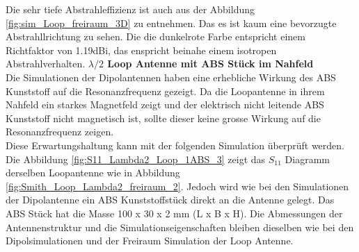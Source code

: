 Die sehr tiefe Abstrahleffizienz ist auch aus der Abbildung \ref{fig:sim_Loop_freiraum_3D} zu entnehmen. Das es ist kaum eine bevorzugte Abstrahllrichtung zu sehen. Die die dunkelrote Farbe entspricht einem Richtfaktor von 1.19dBi, das enspricht beinahe einem isotropen Abstrahlverhalten.
\newpage
\textbf{$\lambda/2$ Loop Antenne mit ABS Stück im Nahfeld}\\
Die Simulationen der Dipolantennen haben eine erhebliche Wirkung des ABS Kunststoff auf die Resonanzfrequenz gezeigt. Da die Loopantenne in ihrem Nahfeld ein starkes Magnetfeld zeigt und der elektrisch nicht leitende ABS Kunststoff  nicht magnetisch ist, sollte dieser keine grosse Wirkung auf die Resonanzfrequenz zeigen.\\ Diese Erwartungshaltung kann mit der folgenden Simulation überprüft werden.\\
 
Die Abbildung \ref{fig:S11_Lambda2_Loop_1ABS_3} zeigt das $S_{11}$ Diagramm derselben Loopantenne wie in Abbildung \ref{fig:Smith_Loop_Lambda2_freiraum_2}. Jedoch wird wie bei den Simulationen der Dipolantenne ein ABS Kunststoffstück direkt an die Antenne gelegt. Das ABS Stück hat die Masse 100 x 30 x 2 mm (L x B x H). Die Abmessungen der Antennenstruktur und die Simulationseigenschaften bleiben  dieselben wie bei den Dipolsimulationen und der Freiraum Simulation der Loop Antenne.\\

